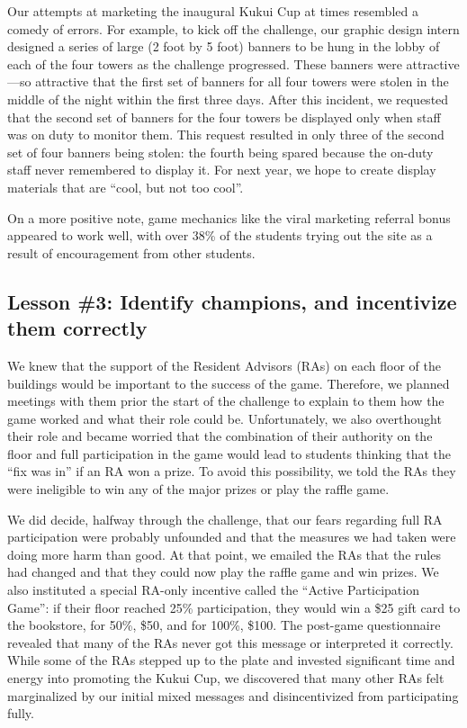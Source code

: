 \documentclass{acm_proc_article-sp}
\begin{document}
Our attempts at marketing the inaugural Kukui Cup at times resembled a comedy
of errors. For example, to kick off the challenge, our graphic design intern
designed a series of large (2 foot by 5 foot) banners to be hung in the lobby
of each of the four towers as the challenge progressed. These banners were
attractive---so attractive that the first set of banners for all four towers
were stolen in the middle of the night within the first three days. After this
incident, we requested that the second set of banners for the four towers be
displayed only when staff was on duty to monitor them.  This request resulted
in only three of the second set of four banners being stolen: the fourth being
spared because the on-duty staff never remembered to display it.  For next
year, we hope to create display materials that are ``cool, but not too cool''.

On a more positive note, game mechanics like the viral marketing referral bonus
appeared to work well, with over 38\% of the students trying out the site as a
result of encouragement from other students.

\subsection{Lesson \#3: Identify champions, and incentivize them correctly}

We knew that the support of the Resident Advisors (RAs) on each floor of the buildings would be important to the success of the game. Therefore, we planned meetings with them prior the start of the challenge to explain to them how the game worked and what their role could be.  Unfortunately, we also overthought their role and became worried that the combination of their authority on the floor and full participation in the game would lead to students thinking that the ``fix was in'' if an RA won a prize.  To avoid this possibility, we told the RAs they were ineligible to win any of the major prizes or play the raffle game.

We did decide, halfway through the challenge, that our fears regarding full RA participation were probably unfounded and that the measures we had taken were doing more harm than good.  At that point, we emailed the RAs that the rules had changed and that they could now play the raffle game and win prizes.  We also instituted a special RA-only incentive called the ``Active Participation Game'':   if their floor reached 25\% participation, they would win a \$25 gift card to the bookstore, for 50\%, \$50, and for 100\%, \$100.   The post-game questionnaire revealed that many of the RAs never got this message or interpreted it correctly. While some of the RAs stepped up to the plate and invested significant time and energy into promoting the Kukui Cup, we discovered that many other RAs felt marginalized by our initial mixed messages and disincentivized from participating fully.
\end{document}
